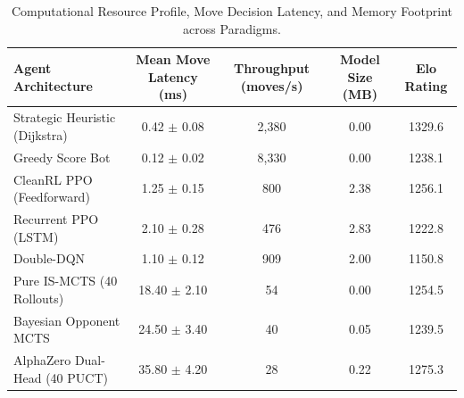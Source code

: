 \begin{table}[htbp]
\centering
\small
\caption{Computational Resource Profile, Move Decision Latency, and Memory Footprint across Paradigms.}
\label{tab:computational_profile}
\begin{tabular}{lcccc}
\toprule
\textbf{Agent Architecture} & \textbf{Mean Move Latency (ms)} & \textbf{Throughput (moves/s)} & \textbf{Model Size (MB)} & \textbf{Elo Rating} \\
\midrule
Strategic Heuristic (Dijkstra) & 0.42 $\pm$ 0.08 & 2,380 & 0.00 & 1329.6 \\
Greedy Score Bot & 0.12 $\pm$ 0.02 & 8,330 & 0.00 & 1238.1 \\
CleanRL PPO (Feedforward) & 1.25 $\pm$ 0.15 & 800 & 2.38 & 1256.1 \\
Recurrent PPO (LSTM) & 2.10 $\pm$ 0.28 & 476 & 2.83 & 1222.8 \\
Double-DQN & 1.10 $\pm$ 0.12 & 909 & 2.00 & 1150.8 \\
Pure IS-MCTS (40 Rollouts) & 18.40 $\pm$ 2.10 & 54 & 0.00 & 1254.5 \\
Bayesian Opponent MCTS & 24.50 $\pm$ 3.40 & 40 & 0.05 & 1239.5 \\
AlphaZero Dual-Head (40 PUCT) & 35.80 $\pm$ 4.20 & 28 & 0.22 & 1275.3 \\
\bottomrule
\end{tabular}
\end{table}
